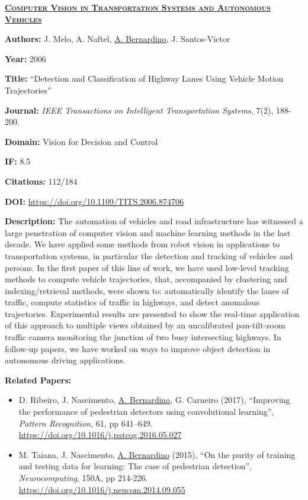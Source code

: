 \clearpage

\textbf{\textsc{\ul{Computer Vision in Transportation Systems and
Autonomous Vehicles}}}

\textbf{Authors:} J. Melo, A. Naftel, \ul{A. Bernardino}, J.
Santos-Victor

\textbf{Year:} 2006

\textbf{Title:} ``Detection and Classification of Highway Lanes Using
Vehicle Motion Trajectories''

\textbf{Journal:} \emph{IEEE Transactions on Intelligent Transportation
Systems,} 7(2), 188-200.

\textbf{Domain:} Vision for Decision and Control

\textbf{IF:} 8.5

\textbf{Citations:} 112/184

\textbf{DOI:} \url{https://doi.org/10.1109/TITS.2006.874706}

\textbf{Description:} The automation of vehicles and road infrastructure
has witnessed a large penetration of computer vision and machine
learning methods in the last decade. We have applied some methods from
robot vision in applications to transportation systems, in particular
the detection and tracking of vehicles and persons. In the first paper
of this line of work, we have used low-level tracking methods to compute
vehicle trajectories, that, accompanied by clustering and
indexing/retrieval methods, were shown to: automatically identify the
lanes of traffic, compute statistics of traffic in highways, and detect
anomalous trajectories. Experimental results are presented to show the
real-time application of this approach to multiple views obtained by an
uncalibrated pan-tilt-zoom traffic camera monitoring the junction of two
busy intersecting highways. In follow-up papers, we have worked on ways
to improve object detection in autonomous driving applications.

\textbf{Related Papers:}

\begin{itemize}
\item
  D. Ribeiro, J. Nascimento, \ul{A. Bernardino}, G. Carneiro (2017),
  ``Improving the performance of pedestrian detectors using
  convolutional learning'', \emph{Pattern Recognition,} 61, pp 641--649.
  \url{https://doi.org/10.1016/j.patcog.2016.05.027}
\item
  M. Taiana, J. Nascimento, \ul{A. Bernardino} (2015), ``On the purity
  of training and testing data for learning: The case of pedestrian
  detection'', \emph{Neurocomputing}, 150A, pp 214-226.
  \url{https://doi.org/10.1016/j.neucom.2014.09.055}
\end{itemize}

